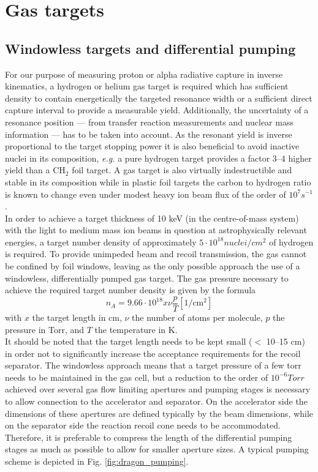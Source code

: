 
\section{Gas targets}\label{gastarg}

\subsection{Windowless targets and differential pumping}


For our purpose of measuring proton or alpha radiative capture in inverse kinematics, a hydrogen or helium gas target is required which has sufficient density  to contain energetically the targeted resonance width or a sufficient direct capture interval to provide a measurable yield. Additionally, the uncertainty of a resonance position --- from transfer reaction measurements and nuclear mass information --- has to be taken into account. As the resonant yield is inverse proportional to the target stopping power it is also beneficial to avoid inactive nuclei in its composition, {\it e.g.} a pure hydrogen target provides a factor 3--4 higher yield than a CH$_2$ foil target.  A gas target is also virtually indestructible and stable in its composition while in plastic foil targets the carbon to hydrogen ratio is known to change even under modest heavy ion beam flux of the order of $10^7 \unit{s^{-1}}$.\\
In order to achieve a target thickness of 10 keV (in the centre-of-mass system) with the light to medium mass ion beams in question at astrophysically relevant energies, a target number density of approximately $5\cdot10^{18} \unit{nuclei/cm^2}$ of hydrogen is required. To provide unimpeded beam and recoil transmission, the gas cannot be confined by foil windows, leaving as the only possible approach the use of a windowless, differentially pumped gas target. The gas pressure necessary to achieve the required target number density is given by the formula \cite{rolf88} 
\begin{equation}
n_A = 9.66\cdot10^{18} x \nu \frac{p}{T} \mathrm{[1/cm^2]}
\end{equation}
with $x$ the target length in cm, $\nu$ the number of atoms per molecule, $p$ the pressure in Torr, and $T$ the temperature in K.\\
It should be noted that the target length needs to be kept small ($<$ 10--15 cm) in order not to significantly increase the acceptance requirements for the recoil separator. The windowless approach means that a target pressure of a few torr needs to be maintained in the gas cell, but a reduction to the order of $10^{-6} \unit{Torr}$ achieved over several gas flow limiting apertures and pumping stages is necessary to allow connection to the accelerator and separator. On the accelerator side the dimensions of these apertures are defined typically by the beam dimensions, while on the separator side the reaction recoil cone needs to be accommodated. Therefore, it is preferable to compress the length of the differential pumping stages as much as possible to allow for smaller aperture sizes. A typical pumping scheme is depicted in Fig. \ref{fig:dragon_pumping}.

